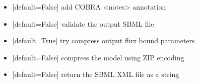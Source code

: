 \documentclass[letterpaper,10pt,english]{sphinxmanual}
\begin{document}
\begin{fulllineitems}
\begin{itemize}
\item {} 
\sphinxAtStartPar
{} {[}default=False{]} add COBRA \textless{}notes\textgreater{} annotation

\item {} 
\sphinxAtStartPar
{} {[}default=False{]} validate the output SBML file

\item {} 
\sphinxAtStartPar
{} {[}default=True{]} try compress output flux bound parameters

\item {} 
\sphinxAtStartPar
{} {[}default=False{]} compress the model using ZIP encoding

\item {} 
\sphinxAtStartPar
{} {[}default=False{]} return the SBML XML file as a string

\end{itemize}

\end{fulllineitems}

\end{document}
